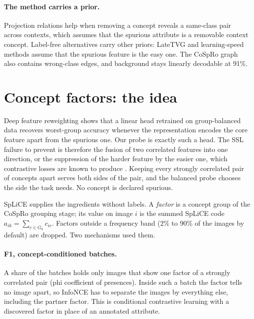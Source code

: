 \documentclass{article}
\begin{document}
\paragraph{The method carries a prior.} Projection relations help when removing a concept reveals a
same-class pair across contexts, which assumes that the spurious attribute is a removable context
concept. Label-free alternatives carry other priors: LateTVG \citep{hamidieh2024views} and
learning-speed methods \citep{zhu2023lassl} assume that the spurious feature is the easy one. The
CoSpRo graph also contains wrong-class edges, and background stays linearly decodable at 91\%.

\section{Concept factors: the idea}
\label{sec:idea}

Deep feature reweighting \citep{kirichenko2023dfr} shows that a linear head retrained on group-balanced
data recovers worst-group accuracy whenever the representation encodes the core feature apart from the
spurious one. Our probe is exactly such a head. The SSL failure to prevent is therefore the fusion of
two correlated features into one direction, or the suppression of the harder feature by the easier one,
which contrastive losses are known to produce \citep{chen2021intriguing,robinson2021shortcut}. Keeping
every strongly correlated pair of concepts apart serves both sides of the pair, and the balanced probe
chooses the side the task needs. No concept is declared spurious.

SpLiCE supplies the ingredients without labels. A \emph{factor} is a concept group of the CoSpRo
grouping stage; its value on image $i$ is the summed SpLiCE code $a_{ik}=\sum_{c\in G_k} c_{ic}$. Factors
outside a frequency band (2\% to 90\% of the images by default) are dropped. Two mechanisms used them.

\paragraph{F1, concept-conditioned batches.} A share of the batches holds only images that show one
factor of a strongly correlated pair (phi coefficient of presences). Inside such a batch the factor
tells no image apart, so InfoNCE has to separate the images by everything else, including the partner
factor. This is conditional contrastive learning \citep{tsai2021conditional} with a discovered factor
in place of an annotated attribute.
\end{document}
